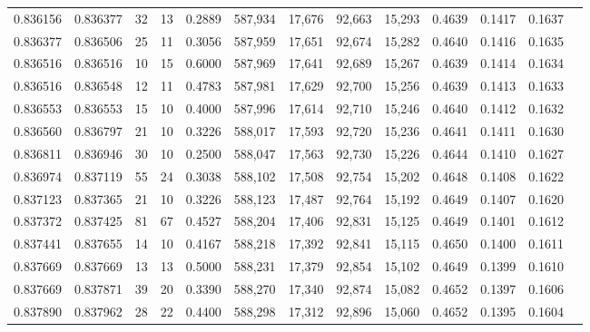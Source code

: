 \begin{tabular}{rrrrrrrrrrrrr}
0.836156 & 0.836377 &    32 &  13 &                                     0.2889 & 587,934 &  17,676 &  92,663 &  15,293 & 0.4639 & 0.1417 & 0.1637 \\
0.836377 & 0.836506 &    25 &  11 &                                     0.3056 & 587,959 &  17,651 &  92,674 &  15,282 & 0.4640 & 0.1416 & 0.1635 \\
0.836516 & 0.836516 &    10 &  15 &                                     0.6000 & 587,969 &  17,641 &  92,689 &  15,267 & 0.4639 & 0.1414 & 0.1634 \\
0.836516 & 0.836548 &    12 &  11 &                                     0.4783 & 587,981 &  17,629 &  92,700 &  15,256 & 0.4639 & 0.1413 & 0.1633 \\
0.836553 & 0.836553 &    15 &  10 &                                     0.4000 & 587,996 &  17,614 &  92,710 &  15,246 & 0.4640 & 0.1412 & 0.1632 \\
0.836560 & 0.836797 &    21 &  10 &                                     0.3226 & 588,017 &  17,593 &  92,720 &  15,236 & 0.4641 & 0.1411 & 0.1630 \\
0.836811 & 0.836946 &    30 &  10 &                                     0.2500 & 588,047 &  17,563 &  92,730 &  15,226 & 0.4644 & 0.1410 & 0.1627 \\
0.836974 & 0.837119 &    55 &  24 &                                     0.3038 & 588,102 &  17,508 &  92,754 &  15,202 & 0.4648 & 0.1408 & 0.1622 \\
0.837123 & 0.837365 &    21 &  10 &                                     0.3226 & 588,123 &  17,487 &  92,764 &  15,192 & 0.4649 & 0.1407 & 0.1620 \\
0.837372 & 0.837425 &    81 &  67 &                                     0.4527 & 588,204 &  17,406 &  92,831 &  15,125 & 0.4649 & 0.1401 & 0.1612 \\
0.837441 & 0.837655 &    14 &  10 &                                     0.4167 & 588,218 &  17,392 &  92,841 &  15,115 & 0.4650 & 0.1400 & 0.1611 \\
0.837669 & 0.837669 &    13 &  13 &                                     0.5000 & 588,231 &  17,379 &  92,854 &  15,102 & 0.4649 & 0.1399 & 0.1610 \\
0.837669 & 0.837871 &    39 &  20 &                                     0.3390 & 588,270 &  17,340 &  92,874 &  15,082 & 0.4652 & 0.1397 & 0.1606 \\
0.837890 & 0.837962 &    28 &  22 &                                     0.4400 & 588,298 &  17,312 &  92,896 &  15,060 & 0.4652 & 0.1395 & 0.1604 \\

\end{tabular}
